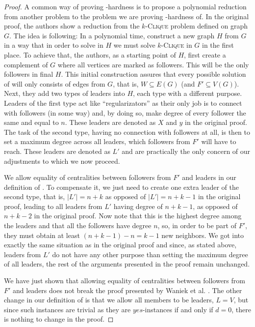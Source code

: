 \begin{proof}
    A common way of proving \NP-hardness is to propose a polynomial reduction from another \NPh problem to the
    problem we are proving \NP-hardness of.
    In the original proof, the authors show a reduction from the $k$-\textsc{Clique} problem defined on graph $G$.
    The idea is following: In a polynomial time, construct a new graph $H$ from $G$ in a way that
    in order to solve \HL in $H$ we must solve $k$-\textsc{Clique} in $G$ in the first place.
    To achieve that, the authors, as a starting point of $H$, first create a complement of $G$ 
    where all vertices are marked as followers. This will be the only followers in final $H$.
    This initial construction assures that every possible solution of \HLshort will only consists of edges from $G$, that is,
    $W \subseteq E(G)$ (and $F' \subseteq V(G)$).
    Next, they add two types of leaders into $H$, each type with a different purpose.
    Leaders of the first type act like ``regularizators'' as their only job is to connect with followers (in some way) and,
    by doing so, make degree of every follower the same and equal to $n$.
    These leaders are denoted as $X$ and $y$ in the original proof.
    The task of the second type, having no connection with followers at all,
    is then to set a maximum degree across all leaders, which followers from $F'$ will have to reach.
    These leaders are denoted as $L'$ and are practically the only concern of our adjustments to which we now proceed.

    We allow equality of centralities between followers from $F'$ and leaders in our definition of \HL.
    To compensate it, we just need to create one extra leader of the second type, that is,
    $|L'| = n+k$ as opposed of $|L'| = n+k-1$ in the original proof,
    leading to all leaders from $L'$ having degree of $n+k-1$, as opposed of $n+k-2$ in the original proof.
    Now note that this is the highest degree among the leaders and that all the followers have degree $n$,
    so, in order to be part of $F'$, they must obtain at least $(n+k-1) - n = k-1$ new neighbors.
    We got into exactly the same situation as in the original proof and since, as stated above,
    leaders from $L'$ do not have any other purpose than setting the maximum degree of all leaders,
    the rest of the arguments presented in the proof remain unchanged.

    We have just shown that allowing equality of centralities between followers from $F'$ and leaders does not
    break the proof presented by Waniek et al. \cite{Waniek2017}.
    The other change in our definition of \HL is that we allow all members to be leaders, $L = V$,
    but since such instances are trivial as they are $yes$-instances if and only if $d = 0$,
    there is nothing to change in the proof.
\end{proof}


